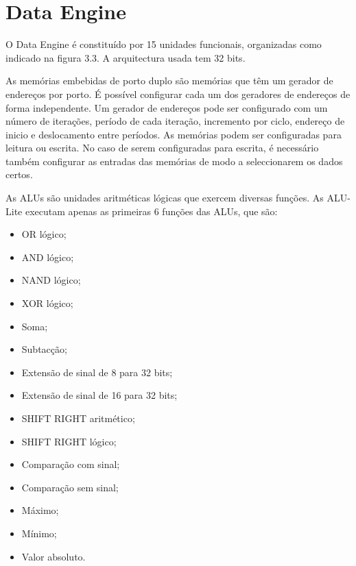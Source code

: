 

\section{Data Engine}
\label{section:Data Engine}

O Data Engine é constituído por 15 unidades funcionais, organizadas como indicado na figura 3.3. A arquitectura usada tem 32 bits.



As memórias embebidas de porto duplo são memórias que têm um gerador de endereços por porto. É possível configurar cada um dos geradores de endereços de forma independente. Um gerador de endereços pode ser configurado com um número de iterações, período de cada iteração, incremento por ciclo, endereço de inicio e deslocamento entre períodos. 
As memórias podem ser configuradas para leitura ou escrita. No caso de serem configuradas para escrita, é necessário também configurar as entradas das memórias de modo a seleccionarem os dados certos.

As ALUs são unidades aritméticas lógicas que exercem diversas funções. As ALU-Lite executam apenas as primeiras 6 funções das ALUs, que são: 

\begin{itemize}
  \item OR lógico;
  \item AND lógico;
  \item NAND lógico;
  \item XOR lógico;
  \item Soma;
  \item Subtacção;
  \item Extensão de sinal de 8 para 32 bits;
  \item Extensão de sinal de 16 para 32 bits;
  \item SHIFT RIGHT aritmético;
  \item SHIFT RIGHT lógico;
  \item Comparação com sinal;
  \item Comparação sem sinal;
  \item Máximo; 
  \item Mínimo;
  \item Valor absoluto.
\end{itemize}

